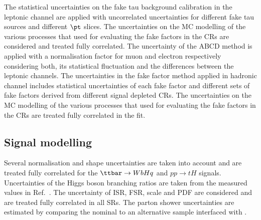 


The statistical uncertainties on the fake tau background calibration in the leptonic channel are applied with uncorrelated uncertainties for
different fake tau sources and different $\pt$ slices. The uncertainties on the MC modelling of the various processes that used for
evaluating the fake factors in the CRs are considered and treated fully correlated.
The uncertainty of the ABCD method is applied with a normalisation factor for muon and electron respectively considering both,
its statistical fluctuation and the differences between the leptonic channels.
The uncertainties in the fake factor method applied in hadronic channel includes statistical uncertainties of each fake factor and different sets of fake factors derived from different signal depleted CRs. The uncertainties on the MC modelling of the various processes that used for
evaluating the fake factors in the CRs are treated fully correlated in the fit.

\subsection{Signal modelling}
\label{sec:syst_sigmodeling}

Several normalisation and shape uncertainties are taken into account and are treated fully correlated for the $\Hq$ and $pp\to tH$ signals.
Uncertainties of the Higgs boson branching ratios are taken from the measured values in Ref.~\cite{Zyla:2020zbs}.
The uncertainty of ISR, FSR, scale and PDF are considered and are treated fully correlated in all SRs. The parton shower uncertainties are estimated by comparing
the nominal to an alternative sample interfaced with {}.


